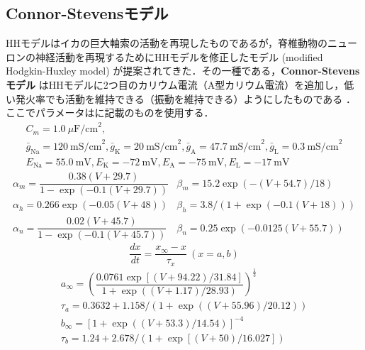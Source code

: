 \subsection{Connor-Stevensモデル}
HHモデルはイカの巨大軸索の活動を再現したものであるが，脊椎動物のニューロンの神経活動を再現するためにHHモデルを修正したモデル (modified Hodgkin-Huxley model) が提案されてきた．その一種である，\textbf{Connor-Stevensモデル} はHHモデルに2つ目のカリウム電流（A型カリウム電流）を追加し，低い発火率でも活動を維持できる（振動を維持できる）ようにしたものである \citep{Connor1971-rs,Connor1977-qo}．ここでパラメータは\citep{Dayan2005-ib}に記載のものを使用する．
\begin{equation}
\begin{array}{l}
C_m=1.0\ \mu\textrm{F/cm}^2,\\ 
\bar{g}_{\text{Na}}=120\ \textrm{mS/cm}^2, \bar{g}_{\text{K}}=20\ \textrm{mS/cm}^2, \bar{g}_{\text{A}}=47.7\ \textrm{mS/cm}^2, \bar{g}_{\text{L}}=0.3\ \textrm{mS/cm}^2\\
E_{\text{Na}}=55.0\ \textrm{mV}, E_{\text{K}}=-72\ \textrm{mV}, E_{\text{A}}=-75\ \textrm{mV},E_{\text{L}}=-17\ \textrm{mV} 
\end{array}
\end{equation}
\begin{equation}
\begin{array}{ll}
\alpha_m=\dfrac{0.38(V+29.7)}{1-\exp (-0.1(V+29.7))} & \beta_m=15.2 \exp (-(V+54.7)/18) \\
\alpha_h=0.266 \exp (-0.05(V+48)) & \beta_h=3.8 /(1+\exp (-0.1(V+18))) \\ 
\alpha_n=\dfrac{0.02(V+45.7)}{1-\exp (-0.1(V+45.7))} & \beta_n=0.25 \exp (-0.0125(V+55.7))
\end{array}
\end{equation}
\begin{equation}
\frac{dx}{dt}=\frac{x_\infty-x}{\tau_x}\ (x=a, b)
\end{equation}
\begin{equation}
\begin{array}{l}
a_{\infty}=\left(\dfrac{0.0761 \exp [(V+94.22)/31.84]}{1+\exp ((V+1.17)/28.93)}\right)^{\frac{1}{3}}\\
\tau_a=0.3632+1.158 /(1+\exp ((V+55.96)/20.12)) \\
b_{\infty}=\left[1+\exp ((V+53.3)/14.54)\right]^{-4}\\
\tau_b=1.24+2.678 /(1+\exp [(V+50)/16.027])
\end{array}
\end{equation}
